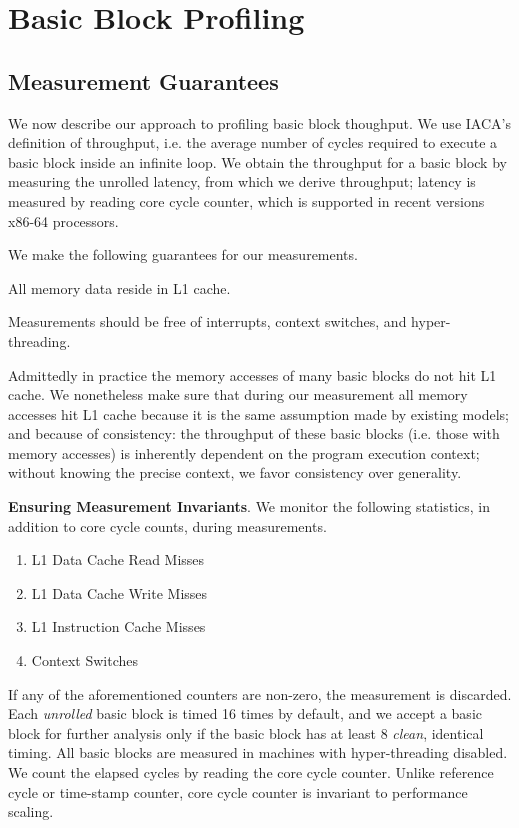 \section{Basic Block Profiling}

\subsection{Measurement Guarantees}
We now describe our approach to profiling basic block thoughput.
We use IACA's definition of throughput, i.e. 
the average number of cycles required to execute a basic block inside
an infinite loop.
We obtain the throughput for a basic block by measuring the unrolled latency,
from which we derive throughput; latency is measured by reading core cycle counter,
which is supported in recent versions x86-64 processors.

We make the following guarantees for our measurements.
\begin{enumerate*}
    \item All memory data reside in L1 cache.
    \item Measurements should be free of interrupts, context switches,
    and hyper-threading.
\end{enumerate*}
Admittedly in practice the memory accesses of many basic blocks do not hit L1 cache.
We nonetheless make sure that during our measurement all memory accesses hit L1 cache 
because it is the same assumption made by existing models;
and because of consistency: the throughput of these basic blocks (i.e. those with memory accesses)
is inherently dependent on the program execution context;
without knowing the precise context, we favor consistency over generality.

\textbf{Ensuring Measurement Invariants}.
We monitor the following statistics, in addition to core cycle counts,
during measurements.
\begin{enumerate}
    \item L1 Data Cache Read Misses
    \item L1 Data Cache Write Misses
    \item L1 Instruction Cache Misses
    \item Context Switches
\end{enumerate}
If any of the aforementioned counters are non-zero,
the measurement is discarded.
Each \textit{unrolled} basic block is timed 16 times by default,
and we accept a basic block for further analysis only if the basic block has at least 
8 \textit{clean}, identical timing.
All basic blocks are measured in machines with hyper-threading disabled.
We count the elapsed cycles by reading the core cycle counter.
Unlike reference cycle or time-stamp counter, core cycle counter is invariant
to performance scaling.


